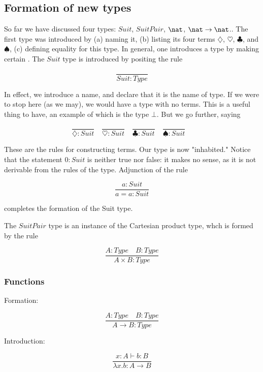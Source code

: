 \subsection{Formation of new types}

So far we have discussed four types: $Suit$, $SuitPair$, $\nat$, $\nat \to \nat$..  The first type was introduced by (a) naming it, (b) listing its four terms $\diamondsuit$, $\heartsuit$, $\clubsuit$, and $\spadesuit$, (c) defining equality for this type.  In general, one introduces a type by making certain .  The $Suit$ type is introduced by positing the rule

$$
\frac{}{Suit : Type}
$$

In effect, we introduce a name, and declare that it is the name of type.  If we were to stop here (as we may), we would have a type with no terms.  This is a useful thing to have, an example of which is the type $\bot$.  But we go further, saying

$$
\frac{}{\diamondsuit : Suit} \quad
\frac{}{\heartsuit : Suit} \quad
\frac{}{\clubsuit : Suit} \quad
\frac{}{\spadesuit : Suit} \quad
$$ 

These are the rules for constructing terms.  Our type is now "inhabited."  
Notice that the statement $0 : Suit$  is neither true nor false: it makes no sense, as it is not derivable from the rules of the type. Adjunction of the rule

$$
\frac{a : Suit}{a = a : Suit}
$$ 

completes the formation of the Suit type. 

The $SuitPair$ type is an instance of the Cartesian product type, whch is formed by the rule

\begin{equation}
\frac{A : Type \quad B : Type}{A\times B : Type}
\end{equation}


\subsubsection{Functions}

Formation:

\begin{equation}
\frac{A : Type \quad B : Type }{A \to B : Type}
\end{equation}


Introduction:

\begin{equation}
\frac{x :  A \vdash b : B}{ \lambda x. b : A \to B}
\end{equation}

